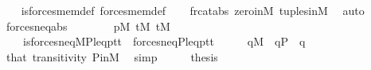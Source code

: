 \begin{isabellebody}
%
\isadelimproof
\ \ %
\endisadelimproof
%
\isatagproof
{}\isamarkupfalse%
\ is{\isacharunderscore}{\kern0pt}forces{\isacharunderscore}{\kern0pt}mem{\isacharprime}{\kern0pt}{\isacharunderscore}{\kern0pt}def\ forces{\isacharunderscore}{\kern0pt}mem{\isacharprime}{\kern0pt}{\isacharunderscore}{\kern0pt}def\isanewline
\ \ \isamarkupfalse%
\ frc{\isacharunderscore}{\kern0pt}at{\isacharunderscore}{\kern0pt}abs\ zero{\isacharunderscore}{\kern0pt}in{\isacharunderscore}{\kern0pt}M\ tuples{\isacharunderscore}{\kern0pt}in{\isacharunderscore}{\kern0pt}M\ \isamarkupfalse%
\ auto%
\endisatagproof
{\isafoldproof}%
%
\isadelimproof
\isanewline
%
\endisadelimproof
\isanewline
{}\isamarkupfalse%
\ forces{\isacharunderscore}{\kern0pt}neq{\isacharprime}{\kern0pt}{\isacharunderscore}{\kern0pt}abs\ {\isacharcolon}{\kern0pt}\isanewline
\ \ \isanewline
\ \ \ \ {\isachardoublequoteopen}p{\isasymin}M{\isachardoublequoteclose}\ {\isachardoublequoteopen}t{}{\isasymin}M{\isachardoublequoteclose}\ {\isachardoublequoteopen}t{}{\isasymin}M{\isachardoublequoteclose}\isanewline
\ \ \isanewline
\ \ \ \ {\isachardoublequoteopen}is{\isacharunderscore}{\kern0pt}forces{\isacharunderscore}{\kern0pt}neq{\isacharprime}{\kern0pt}{\isacharparenleft}{\kern0pt}{\isacharhash}{\kern0pt}{\isacharhash}{\kern0pt}M{\isacharcomma}{\kern0pt}P{\isacharcomma}{\kern0pt}leq{\isacharcomma}{\kern0pt}p{\isacharcomma}{\kern0pt}t{}{\isacharcomma}{\kern0pt}t{}{\isacharparenright}{\kern0pt}\ {\isasymlongleftrightarrow}\ forces{\isacharunderscore}{\kern0pt}neq{\isacharprime}{\kern0pt}{\isacharparenleft}{\kern0pt}P{\isacharcomma}{\kern0pt}leq{\isacharcomma}{\kern0pt}p{\isacharcomma}{\kern0pt}t{}{\isacharcomma}{\kern0pt}t{}{\isacharparenright}{\kern0pt}{\isachardoublequoteclose}\isanewline
%
\isadelimproof
%
\endisadelimproof
%
\isatagproof
{}\isamarkupfalse%
\ {\isacharminus}{\kern0pt}\isanewline
\ \ \isamarkupfalse%
\ {\isachardoublequoteopen}q{\isasymin}M{\isachardoublequoteclose}\ \ {\isachardoublequoteopen}q{\isasymin}P{\isachardoublequoteclose}\ \ q\isanewline
\ \ \ \ \isamarkupfalse%
\ that\ transitivity\ P{\isacharunderscore}{\kern0pt}in{\isacharunderscore}{\kern0pt}M\ \isamarkupfalse%
\ simp\isanewline
\ \ \isamarkupfalse%
\ \isamarkupfalse%
\ {\isacharquery}{\kern0pt}thesis\isanewline
\ \ \ \ \isamarkupfalse%

\end{isabellebody}
